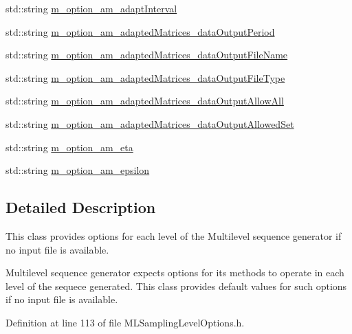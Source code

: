 \begin{DoxyCompactItemize}
\item 
std\-::string \hyperlink{class_q_u_e_s_o_1_1_m_l_sampling_level_options_aaa6a4e45bd064d7b4656e71cfd71d58b}{m\-\_\-option\-\_\-am\-\_\-adapt\-Interval}
\item 
std\-::string \hyperlink{class_q_u_e_s_o_1_1_m_l_sampling_level_options_ac8ab2064bc916c10fa3c7bf1793869e8}{m\-\_\-option\-\_\-am\-\_\-adapted\-Matrices\-\_\-data\-Output\-Period}
\item 
std\-::string \hyperlink{class_q_u_e_s_o_1_1_m_l_sampling_level_options_a50b0b030e51402badf96072ea3add0ba}{m\-\_\-option\-\_\-am\-\_\-adapted\-Matrices\-\_\-data\-Output\-File\-Name}
\item 
std\-::string \hyperlink{class_q_u_e_s_o_1_1_m_l_sampling_level_options_adaf47c65997276c4e7a2e5437a49f5eb}{m\-\_\-option\-\_\-am\-\_\-adapted\-Matrices\-\_\-data\-Output\-File\-Type}
\item 
std\-::string \hyperlink{class_q_u_e_s_o_1_1_m_l_sampling_level_options_a455507e07fb1494b26f4b387a72ca7b3}{m\-\_\-option\-\_\-am\-\_\-adapted\-Matrices\-\_\-data\-Output\-Allow\-All}
\item 
std\-::string \hyperlink{class_q_u_e_s_o_1_1_m_l_sampling_level_options_a28e11986f1c955a367517086890f42bc}{m\-\_\-option\-\_\-am\-\_\-adapted\-Matrices\-\_\-data\-Output\-Allowed\-Set}
\item 
std\-::string \hyperlink{class_q_u_e_s_o_1_1_m_l_sampling_level_options_a6fb0d64c285c2a3411fb24667a03f747}{m\-\_\-option\-\_\-am\-\_\-eta}
\item 
std\-::string \hyperlink{class_q_u_e_s_o_1_1_m_l_sampling_level_options_a5ecc043caa63c4a6980ed61f370bd59a}{m\-\_\-option\-\_\-am\-\_\-epsilon}
\end{DoxyCompactItemize}


\subsection{Detailed Description}
This class provides options for each level of the Multilevel sequence generator if no input file is available. 

Multilevel sequence generator expects options for its methods to operate in each level of the sequece generated. This class provides default values for such options if no input file is available. 

Definition at line 113 of file M\-L\-Sampling\-Level\-Options.\-h.



